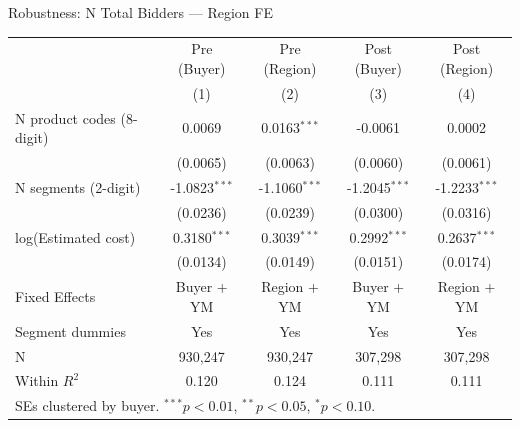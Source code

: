 \documentclass[9pt,aspectratio=169]{beamer}
\begin{document}
\begin{frame}[noframenumbering]{Robustness: N Total Bidders --- Region FE}
\centering\small
\begin{tabular}{lcccc}
\toprule
 & Pre (Buyer) & Pre (Region) & Post (Buyer) & Post (Region) \\
 & (1) & (2) & (3) & (4) \\
\midrule
N product codes (8-digit) & 0.0069 & 0.0163$^{***}$ & -0.0061 & 0.0002 \\
 & (0.0065) & (0.0063) & (0.0060) & (0.0061) \\[2pt]
N segments (2-digit) & -1.0823$^{***}$ & -1.1060$^{***}$ & -1.2045$^{***}$ & -1.2233$^{***}$ \\
 & (0.0236) & (0.0239) & (0.0300) & (0.0316) \\[2pt]
log(Estimated cost) & 0.3180$^{***}$ & 0.3039$^{***}$ & 0.2992$^{***}$ & 0.2637$^{***}$ \\
 & (0.0134) & (0.0149) & (0.0151) & (0.0174) \\[2pt]
\midrule
Fixed Effects & Buyer + YM & Region + YM & Buyer + YM & Region + YM \\
Segment dummies & Yes & Yes & Yes & Yes \\
N & 930,247 & 930,247 & 307,298 & 307,298 \\
Within $R^2$ & 0.120 & 0.124 & 0.111 & 0.111 \\
\bottomrule
\multicolumn{5}{l}{\footnotesize SEs clustered by buyer. $^{***}p<0.01$, $^{**}p<0.05$, $^{*}p<0.10$.} \\
\end{tabular}
\end{frame}
\end{document}
